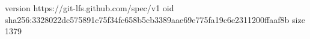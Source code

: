 version https://git-lfs.github.com/spec/v1
oid sha256:3328022dc575891c75f34fc658b5cb3389aae69e775fa19c6e2311200ffaaf8b
size 1379
